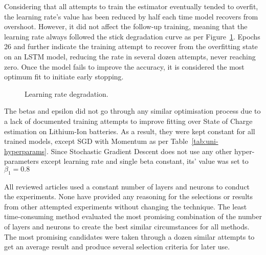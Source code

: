 Considering that all attempts to train the estimator eventually tended to overfit, the learning rate's value has been reduced by half each time model recovers from overshoot.
However, it did not affect the follow-up training, meaning that the learning rate always followed the stick degradation curve as per Figure~\ref{fig:l_rate_progress}.
Epochs 26 and further indicate the training attempt to recover from the overfitting state on an LSTM model, reducing the rate in several dozen attempts, never reaching zero.
Once the model fails to improve the accuracy, it is considered the most optimum fit to initiate early stopping.
\begin{figure}[ht]
    \centering
    
    \caption{Learning rate degradation.}
    \label{fig:l_rate_progress}
\end{figure}

%
The betas and epsilon did not go through any similar optimisation process due to a lack of documented training attempts to improve fitting over State of Charge estimation on Lithium-Ion batteries.
As a result, they were kept constant for all trained models, except SGD with Momentum as per \mbox{Table~\ref{tab:uni-hyperparams}}.
Since Stochastic Gradient Descent does not use any other hyper-parameters except learning rate and single beta constant, its' value was set to $\beta_1 = 0.8$
\begin{table}[htbp]
  \renewcommand{\arraystretch}{1.3}
  \caption{Optimisers Hyper-Parameters}
  \centering
  \label{tab:uni-hyperparams}
\end{table}

%
All reviewed articles used a constant number of layers and neurons to conduct the experiments.
None have provided any reasoning for the selections or results from other attempted experiments without changing the technique.
The least time-consuming method evaluated the most promising combination of the number of layers and neurons to create the best similar circumstances for all methods.
The most promising candidates were taken through a dozen similar attempts to get an average result and produce several selection criteria for later use.

